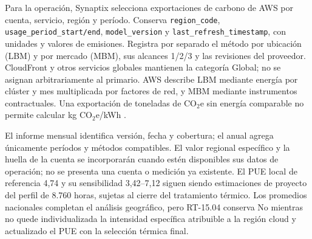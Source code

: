Para la operación, Synaptix selecciona exportaciones de carbono de AWS por cuenta, servicio, región y período. Conserva \texttt{region\_code}, \texttt{usage\_period\_start/end}, \texttt{model\_version} y \texttt{last\_refresh\_timestamp}, con unidades y valores de emisiones. Registra por separado el método por ubicación (LBM) y por mercado (MBM), sus alcances 1/2/3 y las revisiones del proveedor. CloudFront y otros servicios globales mantienen la categoría Global; no se asignan arbitrariamente al primario. AWS describe LBM mediante energía por clúster y mes multiplicada por factores de red, y MBM mediante instrumentos contractuales. Una exportación de toneladas de CO$_2$e sin energía comparable no permite calcular kg CO$_2$e/kWh \parencites{p9-aws-carbon-columns,p9-aws-carbon-method}.

El informe mensual identifica versión, fecha y cobertura; el anual agrega únicamente períodos y métodos compatibles. El valor regional específico y la huella de la cuenta se incorporarán cuando estén disponibles sus datos de operación; no se presenta una cuenta o medición ya existente. El PUE local de referencia 4,74 y su sensibilidad 3,42--7,12 siguen siendo estimaciones de proyecto del perfil de 8.760 horas, sujetas al cierre del tratamiento térmico. Los promedios nacionales completan el análisis geográfico, pero RT-15.04 conserva No mientras no quede individualizada la intensidad específica atribuible a la región cloud y actualizado el PUE con la selección térmica final.
